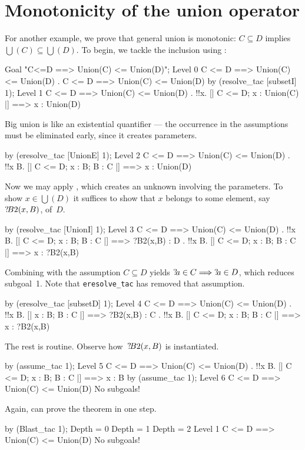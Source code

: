 \section{Monotonicity of the union operator}
For another example, we prove that general union is monotonic:
${C\subseteq D}$ implies $\bigcup(C)\subseteq \bigcup(D)$.  To begin, we
tackle the inclusion using :
\begin{ttbox}
Goal "C<=D ==> Union(C) <= Union(D)";
{\out Level 0}
{\out C <= D ==> Union(C) <= Union(D)}
{. C <= D ==> Union(C) <= Union(D)}
\ttbreak
by (resolve_tac [subsetI] 1);
{\out Level 1}
{\out C <= D ==> Union(C) <= Union(D)}
{. !!x. [| C <= D; x : Union(C) |] ==> x : Union(D)}
\end{ttbox}
Big union is like an existential quantifier --- the occurrence in the
assumptions must be eliminated early, since it creates parameters.
\begin{ttbox}
by (eresolve_tac [UnionE] 1);
{\out Level 2}
{\out C <= D ==> Union(C) <= Union(D)}
{. !!x B. [| C <= D; x : B; B : C |] ==> x : Union(D)}
\end{ttbox}
Now we may apply , which creates an unknown involving the
parameters.  To show $x\in \bigcup(D)$ it suffices to show that $x$ belongs
to some element, say~${?\!B2}(x,B)$, of~$D$.
\begin{ttbox}
by (resolve_tac [UnionI] 1);
{\out Level 3}
{\out C <= D ==> Union(C) <= Union(D)}
{. !!x B. [| C <= D; x : B; B : C |] ==> ?B2(x,B) : D}
{. !!x B. [| C <= D; x : B; B : C |] ==> x : ?B2(x,B)}
\end{ttbox}
Combining  with the assumption $C\subseteq D$ yields 
${?\!a}\in C \Longrightarrow {?\!a}\in D$, which reduces subgoal~1.  Note that
\texttt{eresolve_tac} has removed that assumption.
\begin{ttbox}
by (eresolve_tac [subsetD] 1);
{\out Level 4}
{\out C <= D ==> Union(C) <= Union(D)}
{. !!x B. [| x : B; B : C |] ==> ?B2(x,B) : C}
{. !!x B. [| C <= D; x : B; B : C |] ==> x : ?B2(x,B)}
\end{ttbox}
The rest is routine.  Observe how~${?\!B2}(x,B)$ is instantiated.
\begin{ttbox}
by (assume_tac 1);
{\out Level 5}
{\out C <= D ==> Union(C) <= Union(D)}
{. !!x B. [| C <= D; x : B; B : C |] ==> x : B}
by (assume_tac 1);
{\out Level 6}
{\out C <= D ==> Union(C) <= Union(D)}
{\out No subgoals!}
\end{ttbox}
Again,  can prove the theorem in one step.
\begin{ttbox}
by (Blast_tac 1);
{\out Depth = 0}
{\out Depth = 1}
{\out Depth = 2}
{\out Level 1}
{\out C <= D ==> Union(C) <= Union(D)}
{\out No subgoals!}
\end{ttbox}

